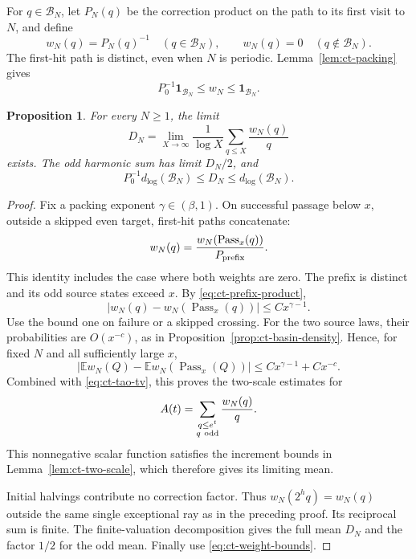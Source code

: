 \documentclass[11pt,a4paper]{article}
\newtheorem{proposition}[theorem]{Proposition}
\begin{document}
For \(q\in\mathcal B_N\), let \(P_N(q)\) be the correction product
on the path to its first visit to \(N\), and define
\[
 w_N(q)=P_N(q)^{-1}\quad(q\in\mathcal B_N),\qquad
 w_N(q)=0\quad(q\notin\mathcal B_N).
\]
The first-hit path is distinct, even when \(N\) is periodic.
Lemma~\ref{lem:ct-packing} gives
\begin{equation}\label{eq:ct-weight-bounds}
 P_0^{-1}\mathbf1_{\mathcal B_N}
          \le w_N\le\mathbf1_{\mathcal B_N}.
\end{equation}

\begin{proposition}\label{prop:ct-weighted-density}
For every \(N\ge1\), the limit
\[
 D_N=\lim_{X\to\infty}\frac1{\log X}
                    \sum_{q\le X}\frac{w_N(q)}q
\]
exists. The odd harmonic sum has limit \(D_N/2\), and
\begin{equation}\label{eq:ct-D-density}
 P_0^{-1}d_{\log}(\mathcal B_N)
       \le D_N\le d_{\log}(\mathcal B_N).
\end{equation}
\end{proposition}
\begin{proof}
Fix a packing exponent \(\gamma\in(\beta,1)\).
On successful passage below \(x\), outside a skipped even target,
first-hit paths concatenate:
\[
 w_N(q)=\frac{w_N(\operatorname{Pass}_x(q))}{P_{\rm prefix}}.
\]
This identity includes the case where both weights are zero.
The prefix is distinct and its odd source states exceed \(x\).
By \eqref{eq:ct-prefix-product},
\[
 |w_N(q)-w_N(\operatorname{Pass}_x(q))|
                         \le Cx^{\gamma-1}.
\]
Use the bound one on failure or a skipped crossing. For the two
source laws, their probabilities are \(O(x^{-c})\), as in
Proposition~\ref{prop:ct-basin-density}. Hence, for fixed \(N\)
and all sufficiently large \(x\),
\[
 |\mathbb E w_N(Q)-\mathbb E w_N(\operatorname{Pass}_x(Q))|
                    \le Cx^{\gamma-1}+Cx^{-c}.
\]
Combined with \eqref{eq:ct-tao-tv}, this proves the two-scale
estimates for
\[
 A(t)=\sum_{\substack{q\le e^t\\q\ {\rm odd}}}\frac{w_N(q)}q.
\]
This nonnegative scalar function satisfies the increment bounds in
Lemma~\ref{lem:ct-two-scale}, which therefore gives its limiting mean.

Initial halvings contribute no correction factor. Thus
\(w_N(2^hq)=w_N(q)\) outside the same single exceptional ray as
in the preceding proof. Its reciprocal sum is finite. The
finite-valuation decomposition gives the full mean \(D_N\) and
the factor \(1/2\) for the odd mean. Finally use
\eqref{eq:ct-weight-bounds}.
\end{proof}
\end{document}
